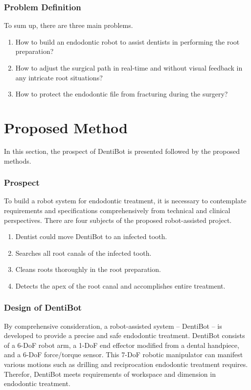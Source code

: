 \subsubsection{Problem Definition}
\hspace*{6mm}To sum up, there are three main problems.
\begin{enumerate}
\item How to build an endodontic robot to assist dentists in performing the root preparation?
\item How to adjust the surgical path in real-time and without visual feedback in any intricate root situations?
\item How to protect the endodontic file from fracturing during the surgery?
\end{enumerate}	
\section{Proposed Method}
\hspace*{6mm}In this section, the prospect of DentiBot is presented followed by the proposed methods.
\subsubsection{Prospect}
\hspace*{6mm}To build a robot system for endodontic treatment, it is necessary to contemplate requirements and specifications comprehensively from technical and clinical perspectives. There are four subjects of the proposed robot-assisted project. 
\begin{enumerate}
	\item Dentist could move DentiBot to an infected tooth. 
	\item Searches all root canals of the infected tooth.
	\item Cleans roots thoroughly in the root preparation.
	\item Detects the apex of the root canal and accomplishes entire treatment.
\end{enumerate}	
\subsubsection{Design of DentiBot}
\hspace*{6mm}By comprehensive consideration, a robot-assisted system -- DentiBot -- is developed to provide a precise and safe endodontic treatment. DentiBot consists of a 6-DoF robot arm, a 1-DoF end effector modified from a dental handpiece, and a 6-DoF force/torque sensor. This 7-DoF robotic manipulator can manifest various motions such as drilling and reciprocation endodontic treatment requires. Therefor, DentiBot meets requirements of workspace and dimension in endodontic treatment.
